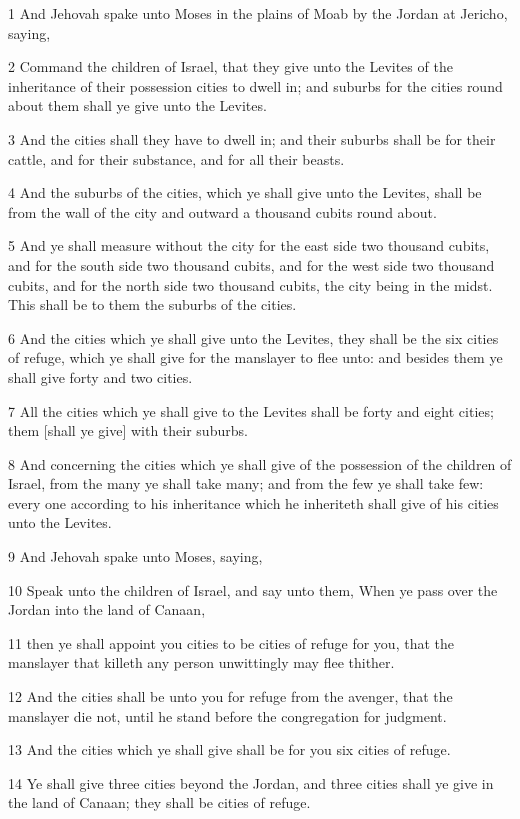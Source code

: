 \par 1 And Jehovah spake unto Moses in the plains of Moab by the Jordan at Jericho, saying,
\par 2 Command the children of Israel, that they give unto the Levites of the inheritance of their possession cities to dwell in; and suburbs for the cities round about them shall ye give unto the Levites.
\par 3 And the cities shall they have to dwell in; and their suburbs shall be for their cattle, and for their substance, and for all their beasts.
\par 4 And the suburbs of the cities, which ye shall give unto the Levites, shall be from the wall of the city and outward a thousand cubits round about.
\par 5 And ye shall measure without the city for the east side two thousand cubits, and for the south side two thousand cubits, and for the west side two thousand cubits, and for the north side two thousand cubits, the city being in the midst. This shall be to them the suburbs of the cities.
\par 6 And the cities which ye shall give unto the Levites, they shall be the six cities of refuge, which ye shall give for the manslayer to flee unto: and besides them ye shall give forty and two cities.
\par 7 All the cities which ye shall give to the Levites shall be forty and eight cities; them [shall ye give] with their suburbs.
\par 8 And concerning the cities which ye shall give of the possession of the children of Israel, from the many ye shall take many; and from the few ye shall take few: every one according to his inheritance which he inheriteth shall give of his cities unto the Levites.
\par 9 And Jehovah spake unto Moses, saying,
\par 10 Speak unto the children of Israel, and say unto them, When ye pass over the Jordan into the land of Canaan,
\par 11 then ye shall appoint you cities to be cities of refuge for you, that the manslayer that killeth any person unwittingly may flee thither.
\par 12 And the cities shall be unto you for refuge from the avenger, that the manslayer die not, until he stand before the congregation for judgment.
\par 13 And the cities which ye shall give shall be for you six cities of refuge.
\par 14 Ye shall give three cities beyond the Jordan, and three cities shall ye give in the land of Canaan; they shall be cities of refuge.
